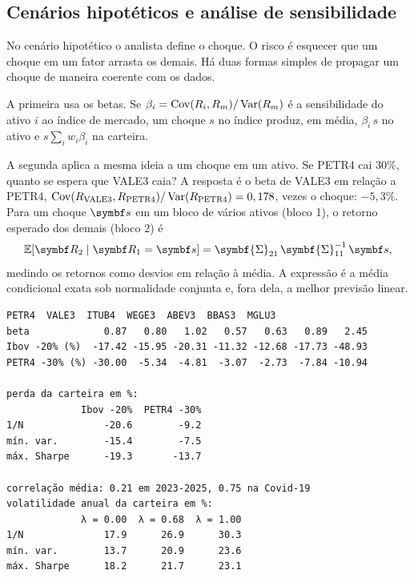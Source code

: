\subsection{Cenários hipotéticos e análise de sensibilidade}

No cenário hipotético o analista define o choque. O risco é esquecer que um choque em um fator arrasta os demais. Há duas formas simples de propagar um choque de maneira coerente com os dados.

A primeira usa os betas. Se $\beta_i = \operatorname{Cov}(R_i, R_m)/\operatorname{Var}(R_m)$ é a sensibilidade do ativo $i$ ao índice de mercado, um choque $s$ no índice produz, em média, $\beta_i\,s$ no ativo e $s\sum_i w_i\beta_i$ na carteira.

A segunda aplica a mesma ideia a um choque em um ativo. Se PETR4 cai 30\%, quanto se espera que VALE3 caia? A resposta é o beta de VALE3 em relação a PETR4, $\operatorname{Cov}(R_{\text{VALE3}}, R_{\text{PETR4}})/\operatorname{Var}(R_{\text{PETR4}}) = 0,178$, vezes o choque: $-5,3\%$. Para um choque $\vetor{s}$ em um bloco de vários ativos (bloco 1), o retorno esperado dos demais (bloco 2) é
\begin{equation}
  \E[\vetor{R}_2 \mid \vetor{R}_1 = \vetor{s}] = \symbf{\Sigma}_{21}\,\symbf{\Sigma}_{11}^{-1}\,\vetor{s} ,
  \label{eq:c08-condicional}
\end{equation}
medindo os retornos como desvios em relação à média. A expressão é a média condicional exata sob normalidade conjunta e, fora dela, a melhor previsão linear.


\begin{lstlisting}[style=saida]
                PETR4  VALE3  ITUB4  WEGE3  ABEV3  BBAS3  MGLU3
beta             0.87   0.80   1.02   0.57   0.63   0.89   2.45
Ibov -20% (%)  -17.42 -15.95 -20.31 -11.32 -12.68 -17.73 -48.93
PETR4 -30% (%) -30.00  -5.34  -4.81  -3.07  -2.73  -7.84 -10.94

perda da carteira em %:
             Ibov -20%  PETR4 -30%
1/N              -20.6        -9.2
mín. var.        -15.4        -7.5
máx. Sharpe      -19.3       -13.7

correlação média: 0.21 em 2023-2025, 0.75 na Covid-19
volatilidade anual da carteira em %:
             λ = 0.00  λ = 0.68  λ = 1.00
1/N              17.9      26.9      30.3
mín. var.        13.7      20.9      23.6
máx. Sharpe      18.2      21.7      23.1
\end{lstlisting}

